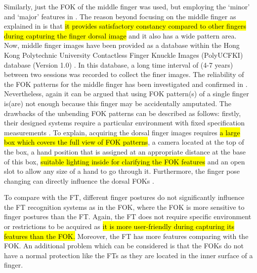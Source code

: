 \documentclass[review]{elsarticle}
\begin{document}

	Similarly, just the FOK of the middle finger was used, but employing the \lq minor' and \lq major' features in \cite{Kumar2014Importance}. The reason beyond focusing on the middle finger as explained in \cite{Kumar2009Human} is that \hl{it provides satisfactory constancy compared to other fingers during capturing the finger dorsal image} and it also has a wide pattern area. Now, middle finger images have been provided as a database within the Hong Kong Polytechnic University Contactless Finger Knuckle Images (PolyUCFKI) database (Version 1.0) \cite{Databasever1PolyUCFKI}. In this database, a long time interval of (4-7 years) between two sessions was recorded to collect the finer images. The reliability of the FOK patterns for the middle finger has been investigated and confirmed in \cite{Kumar2014Importance}. Nevertheless, again it can be argued that using FOK pattern(s) of a single finger is(are) not enough because this finger may be accidentally amputated. The drawbacks of the unbending FOK patterns can be described as follows: firstly, their designed systems require a particular environment with fixed specification measurements \cite{Wang2008Study,Kumar2009Personal,Al-nima2010Design}. To explain, acquiring the dorsal finger images requires \hl{a large box which covers the full view of FOK patterns}, a camera located at the top of the box, a hand position that is assigned at an appropriate distance at the base of this box, \hl{suitable lighting inside for clarifying the FOK features}	and an open slot to allow any size of a hand to go through it. Furthermore, the finger pose changing can directly influence the dorsal FOKs \cite{jaswal2016knuckle}. 
	
	To compare with the FT, different finger postures do not significantly influence the FT recognition systems \cite{Al-Nima2017efficient} as in the FOK, where the FOK is more sensitive to finger postures than the FT. Again, the FT does not require specific environment or restrictions to be acquired as \hl{it is more user-friendly during capturing its features than the FOK.} Moreover, the FT has more features comparing with the FOK. An additional problem which can be considered is that the FOKs do not have a normal protection like the FTs as they are located in the inner surface of a finger. 
\end{document}
